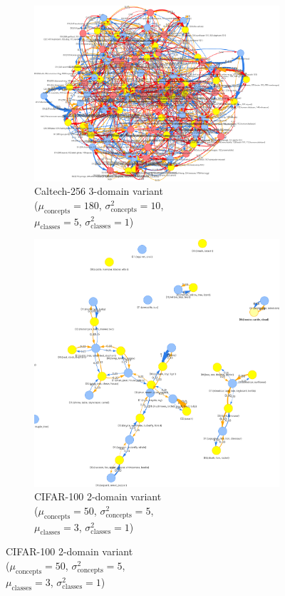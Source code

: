 \begin{figure}[ht]
      \begin{subfigure}[b]{0.4\textwidth}
            \centering
            \includegraphics[width=\textwidth]{figures/caltech256_3domain.png}
            \caption{Caltech-256 3-domain variant\\
            ($\mu_{\text{concepts}}=180$, $\sigma^2_{\text{concepts}}=10$,\\
            $\mu_{\text{classes}}=5$, $\sigma^2_{\text{classes}}=1$)}
            \label{fig:caltech256_3domain}
      \end{subfigure}
      \hfill
      \begin{subfigure}[b]{0.4\textwidth}
            \centering
            \includegraphics[width=\textwidth]{figures/cifar100_2domain.png}
            \caption{CIFAR-100 2-domain variant\\
            ($\mu_{\text{concepts}}=50$, $\sigma^2_{\text{concepts}}=5$,\\
            $\mu_{\text{classes}}=3$, $\sigma^2_{\text{classes}}=1$)}
            \label{fig:cifar100_2domain}
      \end{subfigure}


\end{figure}
